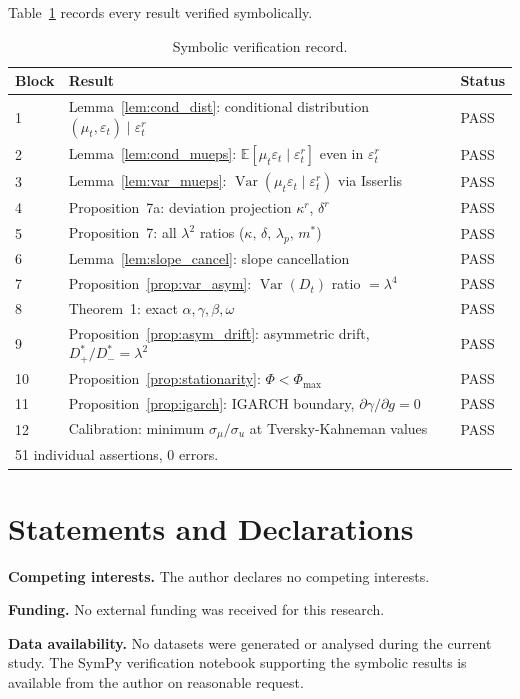 \documentclass[12pt,a4paper]{article}
\theoremstyle{definition}
\begin{document}
Table~\ref{tab:sympy_verification} records every result
verified symbolically.

\begin{table}[ht]
\centering
\caption{Symbolic verification record.}
\label{tab:sympy_verification}
\begin{tabular}{l l l}
\toprule
Block & Result & Status \\
\midrule
1 & Lemma~\ref{lem:cond_dist}: conditional distribution
    $(\mu_t,\varepsilon_t)\mid\varepsilon^r_t$ & PASS \\
2 & Lemma~\ref{lem:cond_mueps}: $\mathbb{E}[\mu_t\varepsilon_t\mid\varepsilon^r_t]$
    even in $\varepsilon^r_t$ & PASS \\
3 & Lemma~\ref{lem:var_mueps}: $\operatorname{Var}(\mu_t\varepsilon_t\mid\varepsilon^r_t)$
    via Isserlis & PASS \\
4 & Proposition~7a: deviation projection $\kappa^r$, $\delta^r$ & PASS \\
5 & Proposition~7: all $\lambda^2$ ratios
    ($\kappa,\,\delta,\,\lambda_p,\,m^*$) & PASS \\
6 & Lemma~\ref{lem:slope_cancel}: slope cancellation & PASS \\
7 & Proposition~\ref{prop:var_asym}: $\operatorname{Var}(D_t)$ ratio $=\lambda^4$ & PASS \\
8 & Theorem~1: exact $\alpha,\gamma,\beta,\omega$ & PASS \\
9 & Proposition~\ref{prop:asym_drift}: asymmetric drift,
    $D^*_+/D^*_- = \lambda^2$ & PASS \\
10 & Proposition~\ref{prop:stationarity}: $\Phi < \Phi_{\max}$ & PASS \\
11 & Proposition~\ref{prop:igarch}: IGARCH boundary,
     $\partial\gamma/\partial g = 0$ & PASS \\
12 & Calibration: minimum $\sigma_\mu/\sigma_u$ at
     Tversky-Kahneman values & PASS \\
\bottomrule
\multicolumn{3}{l}{\footnotesize 51 individual assertions, 0 errors.}
\end{tabular}
\end{table}


\section*{Statements and Declarations}

\noindent\textbf{Competing interests.} The author declares no competing interests.

\noindent\textbf{Funding.} No external funding was received for this research.

\noindent\textbf{Data availability.} No datasets were generated or analysed during the current study. The SymPy verification notebook supporting the symbolic results is available from the author on reasonable request.




\end{document}
